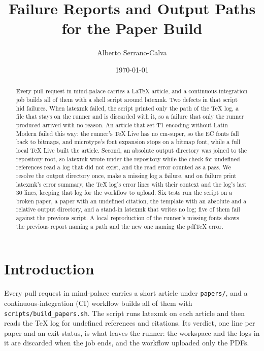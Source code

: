 \documentclass[11pt]{article}
\title{Failure Reports and Output Paths for the Paper Build}
\author{Alberto Serrano-Calva}
\date{\today}
\theoremstyle{plain}
\theoremstyle{definition}
\newcommand{\code}[1]{\texttt{#1}}
\begin{document}
\maketitle

\begin{abstract}
Every pull request in mind-palace carries a LaTeX article, and a continuous-integration job builds
all of them with a shell script around latexmk. Two defects in that script hid failures. When
latexmk failed, the script printed only the path of the TeX log, a file that stays on the runner
and is discarded with it, so a failure that only the runner produced arrived with no reason. An
article that set T1 encoding without Latin Modern failed this way: the runner's TeX Live has no
cm-super, so the EC fonts fall back to bitmaps, and microtype's font expansion stops on a bitmap
font, while a full local TeX Live built the article. Second, an absolute output directory was
joined to the repository root, so latexmk wrote under the repository while the check for undefined
references read a log that did not exist, and the read error counted as a pass. We resolve the
output directory once, make a missing log a failure, and on failure print latexmk's error summary,
the TeX log's error lines with their context and the log's last 30 lines, keeping that log for the
workflow to upload. Six tests run the script on a broken paper, a paper with an undefined
citation, the template with an absolute and a relative output directory, and a stand-in latexmk
that writes no log; five of them fail against the previous script. A local reproduction of the
runner's missing fonts shows the previous report naming a path and the new one naming the pdfTeX
error.
\end{abstract}

\section{Introduction}
Every pull request in mind-palace carries a short article under \code{papers/}, and a
continuous-integration (CI) workflow builds all of them with \code{scripts/build\_papers.sh}. The
script runs latexmk on each article and then reads the TeX log for undefined references and
citations. Its verdict, one line per paper and an exit status, is what leaves the runner: the
workspace and the logs in it are discarded when the job ends, and the workflow uploaded only the
PDFs.
\end{document}
